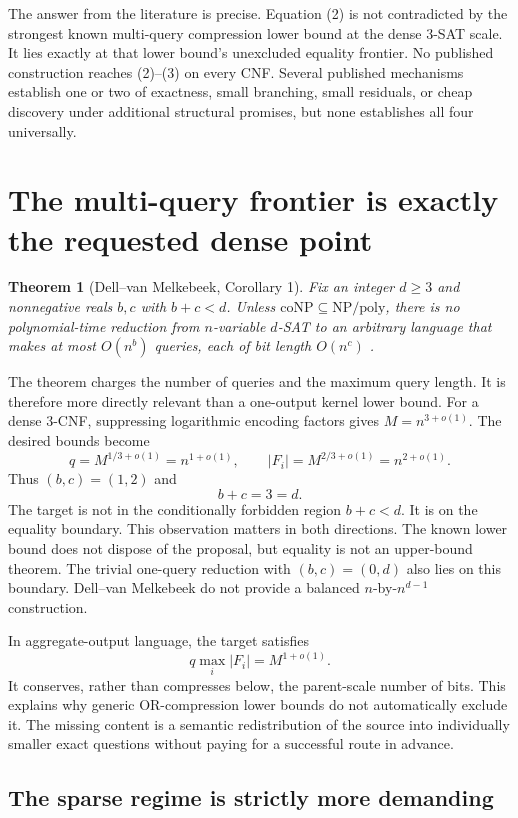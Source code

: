 \documentclass[11pt]{article}
\newtheorem{theorem}{Theorem}
\begin{document}
The answer from the literature is precise.  Equation (2) is not contradicted
by the strongest known multi-query compression lower bound at the dense
$3$-SAT scale.  It lies exactly at that lower bound's unexcluded equality
frontier.  No published construction reaches (2)--(3) on every CNF.  Several
published mechanisms establish one or two of exactness, small branching,
small residuals, or cheap discovery under additional structural promises,
but none establishes all four universally.

\section{The multi-query frontier is exactly the requested dense point}

\begin{theorem}[Dell--van Melkebeek, Corollary 1]\label{thm:dvm}
Fix an integer $d\ge3$ and nonnegative reals $b,c$ with $b+c<d$.  Unless
$\mathrm{coNP}\subseteq\mathrm{NP/poly}$, there is no polynomial-time
reduction from $n$-variable $d$-SAT to an arbitrary language that makes at
most $O(n^b)$ queries, each of bit length $O(n^c)$
\cite{dellvanmelkebeek2014}.
\end{theorem}

The theorem charges the number of queries and the maximum query length.  It
is therefore more directly relevant than a one-output kernel lower bound.
For a dense $3$-CNF, suppressing logarithmic encoding factors gives
$M=n^{3+o(1)}$.  The desired bounds become
\[
 q=M^{1/3+o(1)}=n^{1+o(1)},\qquad
 |F_i|=M^{2/3+o(1)}=n^{2+o(1)}.
\]
Thus $(b,c)=(1,2)$ and
\[
 b+c=3=d. \tag{4}
\]
The target is not in the conditionally forbidden region $b+c<d$.  It is on
the equality boundary.  This observation matters in both directions.  The
known lower bound does not dispose of the proposal, but equality is not an
upper-bound theorem.  The trivial one-query reduction with $(b,c)=(0,d)$
also lies on this boundary.  Dell--van Melkebeek do not provide a balanced
$n$-by-$n^{d-1}$ construction.

In aggregate-output language, the target satisfies
\[
 q\max_i|F_i|=M^{1+o(1)}. \tag{5}
\]
It conserves, rather than compresses below, the parent-scale number of bits.
This explains why generic OR-compression lower bounds do not automatically
exclude it.  The missing content is a semantic redistribution of the source
into individually smaller exact questions without paying for a successful
route in advance.

\subsection{The sparse regime is strictly more demanding}
\end{document}
